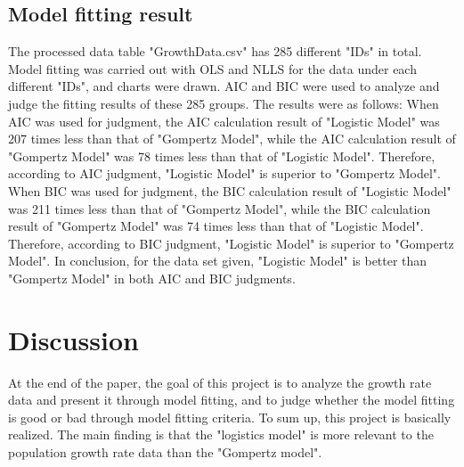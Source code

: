 \documentclass[11pt]{article}
\begin{document}
    \subsection{Model fitting result}
    The processed data table "GrowthData.csv" has 285 different "IDs" in total. Model fitting was carried out with OLS and NLLS for the data under each different "IDs", and charts were drawn. AIC and BIC were used to analyze and judge the fitting results of these 285 groups. The results were as follows: When AIC was used for judgment, the AIC calculation result of "Logistic Model" was 207 times less than that of "Gompertz Model", while the AIC calculation result of "Gompertz Model" was 78 times less than that of "Logistic Model". Therefore, according to AIC judgment, "Logistic Model" is superior to "Gompertz Model". When BIC was used for judgment, the BIC calculation result of "Logistic Model" was 211 times less than that of "Gompertz Model", while the BIC calculation result of "Gompertz Model" was 74 times less than that of "Logistic Model". Therefore, according to BIC judgment, "Logistic Model" is superior to "Gompertz Model". In conclusion, for the data set given, "Logistic Model" is better than "Gompertz Model" in both AIC and BIC judgments. 
  \section{Discussion}
    At the end of the paper, the goal of this project is to analyze the growth rate data and present it through model fitting, and to judge whether the model fitting is good or bad through model fitting criteria. To sum up, this project is basically realized. The main finding is that the "logistics model" is more relevant to the population growth rate data than the "Gompertz model". 
  
\end{document}
